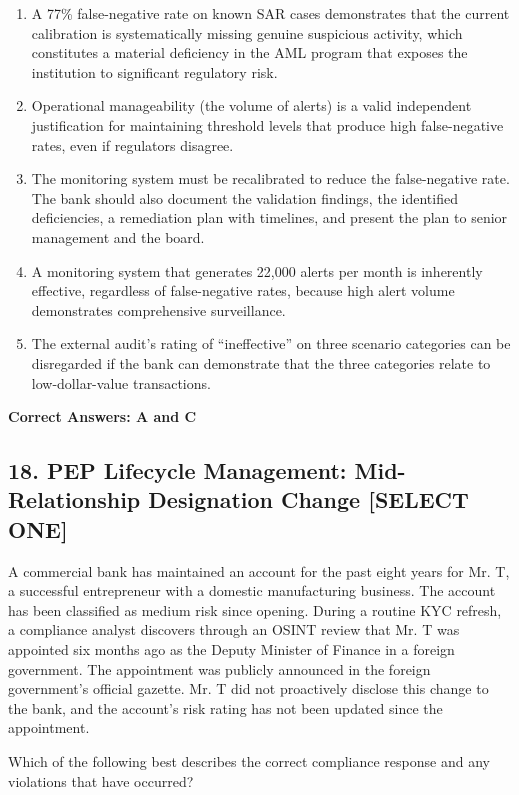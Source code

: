 \documentclass[11pt,a4paper]{article}
\begin{document}
	\begin{enumerate}[label=\Alph*.]
		\item A 77\% false-negative rate on known SAR cases demonstrates that the current calibration is systematically missing genuine suspicious activity, which constitutes a material deficiency in the AML program that exposes the institution to significant regulatory risk.
		\item Operational manageability (the volume of alerts) is a valid independent justification for maintaining threshold levels that produce high false-negative rates, even if regulators disagree.
		\item The monitoring system must be recalibrated to reduce the false-negative rate. The bank should also document the validation findings, the identified deficiencies, a remediation plan with timelines, and present the plan to senior management and the board.
		\item A monitoring system that generates 22,000 alerts per month is inherently effective, regardless of false-negative rates, because high alert volume demonstrates comprehensive surveillance.
		\item The external audit's rating of ``ineffective'' on three scenario categories can be disregarded if the bank can demonstrate that the three categories relate to low-dollar-value transactions.
	\end{enumerate}
	\textbf{Correct Answers: A and C}
	
	\subsection{18. PEP Lifecycle Management: Mid-Relationship Designation Change \textnormal{[SELECT ONE]}}
	
	A commercial bank has maintained an account for the past eight years for Mr. T, a successful entrepreneur with a domestic manufacturing business. The account has been classified as medium risk since opening. During a routine KYC refresh, a compliance analyst discovers through an OSINT review that Mr. T was appointed six months ago as the Deputy Minister of Finance in a foreign government. The appointment was publicly announced in the foreign government's official gazette. Mr. T did not proactively disclose this change to the bank, and the account's risk rating has not been updated since the appointment.
	
	Which of the following best describes the correct compliance response and any violations that have occurred?
	
\end{document}
